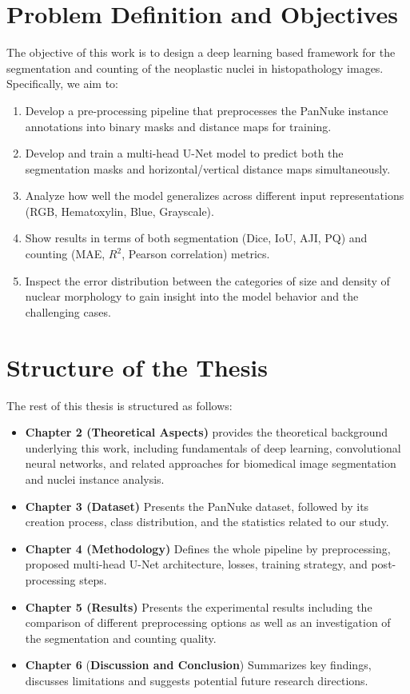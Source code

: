 \documentclass[target=bach,aauheader=,style=]{thud}
\begin{document}
\section{Problem Definition and Objectives}
The objective of this work is to design a deep learning based framework for the segmentation and counting of the neoplastic nuclei in histopathology images. Specifically, we aim to:
\begin{enumerate}
\item Develop a pre-processing pipeline that preprocesses the PanNuke instance annotations into binary masks and distance maps for training.
\item Develop and train a multi-head U-Net model to predict both the segmentation masks and horizontal/vertical distance maps simultaneously.
\item Analyze how well the model generalizes across different input representations (RGB, Hematoxylin, Blue, Grayscale).
\item Show results in terms of both segmentation (Dice, IoU, AJI, PQ) and counting (MAE, $R^2$, Pearson correlation) metrics.
\item Inspect the error distribution between the categories of size and density of nuclear morphology to gain insight into the model behavior and the challenging cases.
\end{enumerate}

\section{Structure of the Thesis}
The rest of this thesis is structured as follows:
\begin{itemize}
\item \textbf{Chapter 2 (Theoretical Aspects)} provides the theoretical background underlying this work, including fundamentals of deep learning, convolutional neural networks, and related approaches for biomedical image segmentation and nuclei instance analysis.
\item \textbf{Chapter 3 (Dataset)} Presents the PanNuke dataset, followed by its creation process, class distribution, and the statistics related to our study.
\item \textbf{Chapter 4 (Methodology)} Defines the whole pipeline by preprocessing, proposed multi-head U-Net architecture, losses, training strategy, and post-processing steps.
\item \textbf{Chapter 5 (Results)} Presents the experimental results including the comparison of different preprocessing options as well as an investigation of the segmentation and counting quality.
\item \textbf{Chapter 6} (\textbf{Discussion and Conclusion}) Summarizes key findings, discusses limitations and suggests potential future research directions.
\end{itemize}
\end{document}
